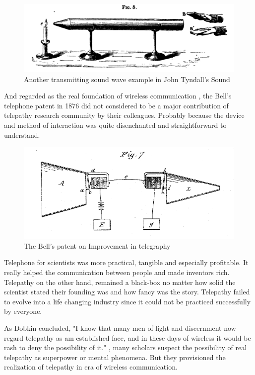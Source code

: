 \documentclass[a4paper]{article}
\begin{document}
\begin{figure}
	\centering
	\includegraphics[width= \linewidth]{Sound2}
	\caption{Another transmitting sound wave example in John Tyndall's Sound}
	\label{fig:Sound1}
\end{figure}

And regarded as the real foundation of wireless communication \autocite{bell1876improvement}, the Bell's telephone patent in 1876 did not considered to be a major contribution of telepathy research community by their colleagues. Probably because the device and method of interaction was quite disenchanted and straightforward to understand.

\begin{figure}
	\centering
	\includegraphics[width= \linewidth]{Bell}
	\caption{The Bell's patent on Improvement in telegraphy}
	\label{fig:Bell}
\end{figure}

Telephone for scientists was more practical, tangible and especially profitable. It really helped the communication between people and made inventors rich. Telepathy on the other hand, remained a black-box no matter how solid the scientist stated their founding was and how fancy was the story. Telepathy failed to evolve into a life changing industry since it could not be practiced successfully by everyone.

As Dobkin concluded, "I know that many men of light and discernment now regard telepathy as am established face, and in these days of wireless it would be rash to deny the possibility of it." \autocite{luckhurst2002invention}, many scholars suspect the possibility of real telepathy as superpower or mental phenomena. But they provisioned the realization of telepathy in era of wireless communication.
\end{document}
